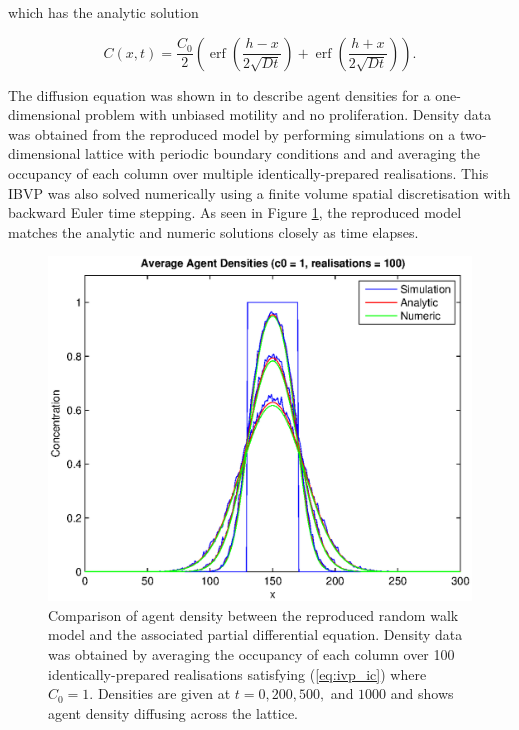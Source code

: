 \documentclass[11pt,a4paper]{article}
\DeclareMathOperator\erf{erf}
\begin{document}
		which has the analytic solution
		
		\begin{equation}
			C(x,t) = \frac{C_0}{2} \left(\erf\left(\frac{h - x}{2 \sqrt{Dt}} \right) + \erf\left(\frac{h + x}{2 \sqrt{Dt}} \right)\right).
			\label{eq:analytic_con_prolif}
		\end{equation}
		
		The diffusion equation was shown in \cite{simpson2009diffusing} to describe agent densities for a one-dimensional problem with unbiased motility and no proliferation. Density data was obtained from the reproduced model by performing simulations on a two-dimensional lattice with periodic boundary conditions and and averaging the occupancy of each column over multiple identically-prepared realisations. This IBVP was also solved numerically using a finite volume spatial discretisation with backward Euler time stepping. As seen in Figure \ref{fig:cell_concentration_1_100}, the reproduced model matches the analytic and numeric solutions closely as time elapses.

		\begin{figure}[tbh]
			\centering
				\includegraphics[width=\textwidth]{./Figures/cell_concentration_1_100.eps}
			\caption{Comparison of agent density between the reproduced random walk model and the associated partial differential equation. Density data was obtained by averaging the occupancy of each column over 100 identically-prepared realisations satisfying (\ref{eq:ivp_ic}) where $C_0 = 1$. Densities are given at $t = 0, 200, 500,$ and $1000$ and shows agent density diffusing across the lattice.}
			\label{fig:cell_concentration_1_100}
		\end{figure}
\end{document}
